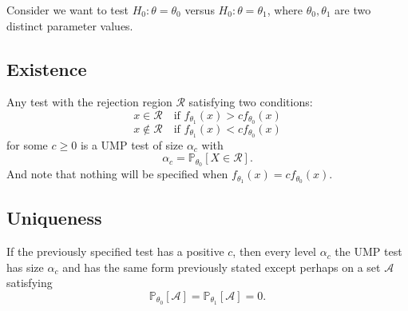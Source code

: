 \begin{lemma}
    Consider we want to test $H_0 : \theta = \theta_0$ versus 
    $H_0 : \theta = \theta_1$, where $\theta_0, \theta_1$ are two distinct parameter values.

    \subsection*{Existence}
    Any test with the rejection region $\mathcal{R}$ satisfying two conditions:
    \[
        x \in \mathcal{R} \quad \text{if } f_{\theta_1}(x) > c f_{\theta_0}(x)
    \]
    \[
        x \notin \mathcal{R} \quad \text{if } f_{\theta_1}(x) < c f_{\theta_0}(x)
    \]
    for some $c \geq 0$ is a UMP test of size $\alpha_c$ with 
    \begin{equation}
        \alpha_c = \mathbb{P}_{\theta_0}[X \in \mathcal{R}].
    \end{equation}
    And note that nothing will be specified when $f_{\theta_1}(x) = c f_{\theta_0}(x)$.

    \subsection*{Uniqueness}
     If the previously specified test has a positive $c$, then every level $\alpha_c$ 
     the UMP test has size $\alpha_c$  and has the same form previously stated except
     perhaps on a set $\mathcal{A}$ satisfying
     \begin{equation}
      \mathbb{P}_{\theta_0}[\mathcal{A}] = \mathbb{P}_{\theta_1}[\mathcal{A}] = 0.
     \end{equation}
\end{lemma}
